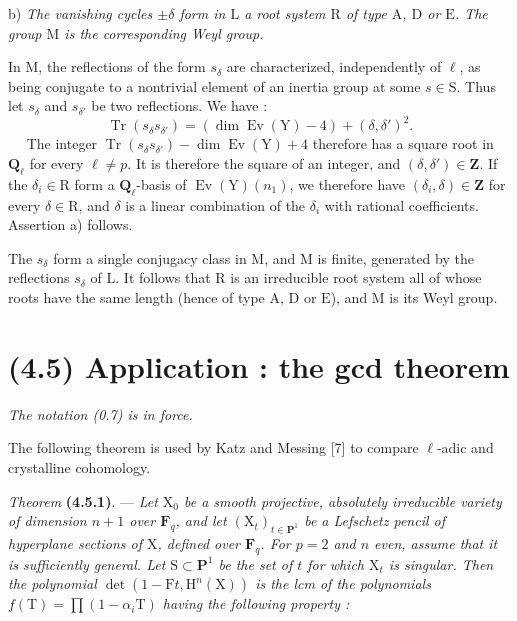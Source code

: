 \documentclass[11pt,leqno]{article}
\newcommand{\Page}[1]{\ifvmode\noindent\else\unskip\ \fi{\footnotesize\textcolor{gray}{[p.\,#1]}}\ \ignorespaces}
\begin{document}
b) \textit{The vanishing cycles \(\pm\delta\) form in \(\mathrm{L}\) a root system \(\mathrm{R}\) of type \(\mathrm{A}\), \(\mathrm{D}\) or \(\mathrm{E}\). The group \(\mathrm{M}\) is the corresponding Weyl group.}

In \(\mathrm{M}\), the reflections of the form \(s_\delta\) are characterized, independently of \(\ell\), as being conjugate to a nontrivial element of an inertia group at some \(s\in\mathrm{S}\). Thus let \(s_\delta\) and \(s_{\delta'}\) be two reflections. We have :
\[
\operatorname{Tr}(s_\delta s_{\delta'})
=(\dim\operatorname{Ev}(\mathrm{Y})-4)+(\delta,\delta')^2.
\]
\Page{231}
The integer \(\operatorname{Tr}(s_\delta s_{\delta'})-\dim\operatorname{Ev}(\mathrm{Y})+4\) therefore has a square root in \(\mathbf{Q}_\ell\) for every \(\ell\neq p\). It is therefore the square of an integer, and \((\delta,\delta')\in\mathbf{Z}\). If the \(\delta_i\in\mathrm{R}\) form a \(\mathbf{Q}_\ell\)-basis of \(\operatorname{Ev}(\mathrm{Y})(n_1)\), we therefore have \((\delta_i,\delta)\in\mathbf{Z}\) for every \(\delta\in\mathrm{R}\), and \(\delta\) is a linear combination of the \(\delta_i\) with rational coefficients. Assertion a) follows.

The \(s_\delta\) form a single conjugacy class in \(\mathrm{M}\), and \(\mathrm{M}\) is finite, generated by the reflections \(s_\delta\) of \(\mathrm{L}\). It follows that \(\mathrm{R}\) is an irreducible root system all of whose roots have the same length (hence of type \(\mathrm{A}\), \(\mathrm{D}\) or \(\mathrm{E}\)), and \(\mathrm{M}\) is its Weyl group.

\section*{(4.5) Application : the gcd theorem}

\textit{The notation \textup{(0.7)} is in force.}

The following theorem is used by Katz and Messing [7] to compare \(\ell\)-adic and crystalline cohomology.

\textit{Theorem} \textbf{(4.5.1)}. — \textit{Let \(\mathrm{X}_0\) be a smooth projective, absolutely irreducible variety of dimension \(n+1\) over \(\mathbf{F}_q\), and let \((\mathrm{X}_t)_{t\in\mathbf{P}^1}\) be a Lefschetz pencil of hyperplane sections of \(\mathrm{X}\), defined over \(\mathbf{F}_q\). For \(p=2\) and \(n\) even, assume that it is sufficiently general. Let \(\mathrm{S}\subset\mathbf{P}^1\) be the set of \(t\) for which \(\mathrm{X}_t\) is singular. Then the polynomial \(\det(1-\mathrm{F}t,\mathrm{H}^n(\mathrm{X}))\) is the lcm of the polynomials \(f(\mathrm{T})=\prod(1-\alpha_i\mathrm{T})\) having the following property :}
\end{document}
